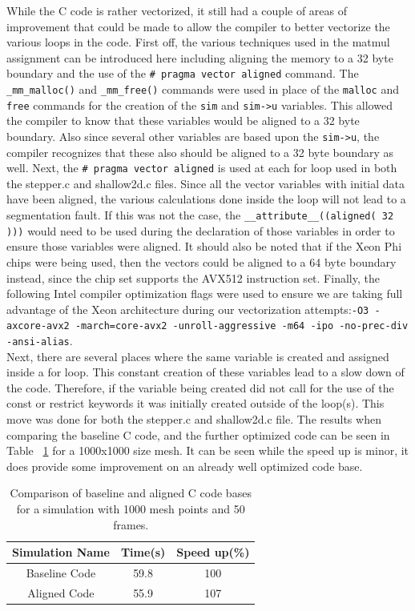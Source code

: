 \documentclass[12pt]{article}
\begin{document}
While the C code is rather vectorized, it still had a couple of areas of improvement that could be made to allow the compiler to better vectorize the various loops in the code. First off, the various techniques used in the matmul assignment can be introduced here including aligning the memory to a 32 byte boundary and the use of the \texttt{\# pragma vector aligned} command. The \texttt{\_mm\_malloc()} and \texttt{\_mm\_free()} commands were used in place of the \texttt{malloc} and \texttt{free} commands for the creation of the \texttt{sim} and \texttt{sim->u} variables. This allowed the compiler to know that these variables would be aligned to a 32 byte boundary. Also since several other variables are based upon the \texttt{sim->u}, the compiler recognizes that these also should be aligned to a 32 byte boundary as well. Next, the \texttt{\# pragma vector aligned} is used at each for loop used in both the stepper.c and shallow2d.c files. Since all the vector variables with initial data have been aligned, the various calculations done inside the loop will not lead to a segmentation fault. If this was not the case, the \texttt{\_\_attribute\_\_((aligned( 32 )))} would need to be used during the declaration of those variables in order to ensure those variables were aligned. It should also be noted that if the Xeon Phi chips were being used, then the vectors could be aligned to a 64 byte boundary instead, since the chip set supports the AVX512 instruction set. Finally, the following Intel compiler optimization flags were used to ensure we are taking full advantage of the Xeon architecture during our vectorization attempts:\texttt{-O3 -axcore-avx2 -march=core-avx2 -unroll-aggressive -m64 -ipo -no-prec-div -ansi-alias}. \\

Next, there are several places where the same variable is created and assigned inside a for loop. This constant creation of these variables lead to a slow down of the code. Therefore, if the variable being created did not call for the use of the const or restrict keywords it was initially created outside of the loop(s). This move was done for both the stepper.c and shallow2d.c file. The results when comparing the baseline C code, and the further optimized code can be seen in Table ~\ref{opttable} for a 1000x1000 size mesh. It can be seen while the speed up is minor, it does provide some improvement on an already well optimized code base.

\begin{table}[h]
	\begin{center}
		\begin{tabular}{|c c c|}
			\hline
			Simulation Name & Time(s) & Speed up(\%) \\ \hline
			Baseline Code & 59.8 & 100   \\ \hline
			Aligned Code & 55.9 & 107 \\ \hline
		\end{tabular}
		\caption{Comparison of baseline and aligned C code bases for a simulation with 1000 mesh points and 50 frames.}
		\label{opttable}
	\end{center}
\end{table}
\end{document}
